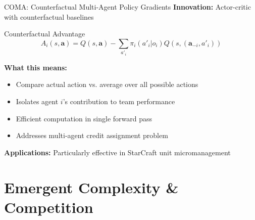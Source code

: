\documentclass[aspectratio=169]{beamer}
\begin{document}
\begin{frame}{COMA: Counterfactual Multi-Agent Policy Gradients}
    \textbf{Innovation:} Actor-critic with counterfactual baselines \autocite{foerster_counterfactual_2018}
    \vfill
    \begin{block}{Counterfactual Advantage}
        $$A_i(s, \mathbf{a}) = Q(s, \mathbf{a}) - \sum_{a'_i} \pi_i(a'_i|o_i) Q(s, (\mathbf{a}_{-i}, a'_i))$$
    \end{block}
    \vfill
    \textbf{What this means:}
    \begin{itemize}
        \item Compare actual action vs. average over all possible actions
        \item Isolates agent $i$'s contribution to team performance  
        \item Efficient computation in single forward pass
        \item Addresses multi-agent credit assignment problem
    \end{itemize}
    \vfill
    \textbf{Applications:} Particularly effective in StarCraft unit micromanagement
\end{frame}

\section{Emergent Complexity \& Competition}
\end{document}
